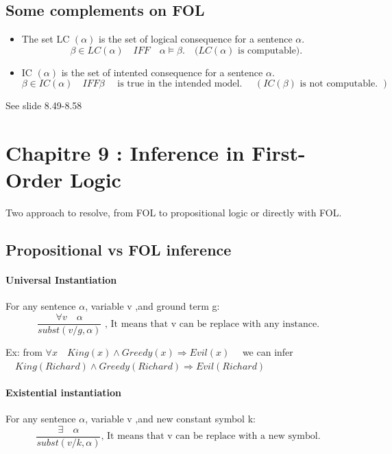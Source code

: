 \subsection{Some complements on FOL}
	\begin{itemize}
		\item The set LC $(\alpha)$ is the set of logical consequence for a sentence $\alpha$. 
            $$\beta \in LC(\alpha) \quad IFF \quad \alpha \models \beta. \quad (LC(\alpha) \textrm{ is computable)}.$$
	
		\item IC $(\alpha)$ is the set of intented consequence for a sentence $\alpha$.
            $$\beta \in IC(\alpha) \quad IFF \beta \quad \textrm{ is true in the intended model. } \quad (IC (\beta) \textrm{ is not computable. })$$
	\end{itemize}	

See slide 8.49-8.58

\section{Chapitre 9 : Inference in First-Order Logic }

Two approach  to resolve,  from FOL to  propositional logic  or directly
with FOL.

\subsection{Propositional vs FOL inference}

\paragraph{Universal   Instantiation}   For   any   sentence   $\alpha$,
variable    v   ,and    ground    term    g:   $$\frac{\forall    v\quad
\alpha}{subst({v/g},\alpha)} \textrm{ ,  It means that v  can be replace
with any instance.} $$

  Ex:   from   $\forall    x\quad   King(x)\wedge   Greedy(x)\Rightarrow
  Evil(x)\quad   $   we  can   infer   $\quad   King(  Richard)   \wedge
  Greedy(Richard) \Rightarrow Evil(Richard)$

\paragraph{Existential   instantiation}  For   any  sentence   $\alpha$,
variable v ,and new constant symbol k:
$$\frac{\exists\quad\alpha}{subst({v/k},\alpha)} \textrm{, It means that
v can be replace with a new symbol.} $$


